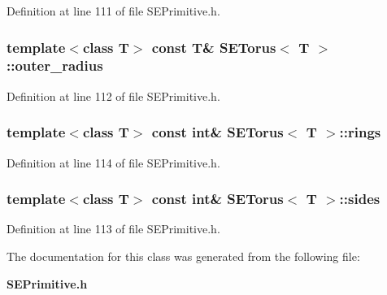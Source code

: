 Definition at line 111 of file S\+E\+Primitive.\+h.

\subsubsection[{outer\+\_\+radius}]{\setlength{\rightskip}{0pt plus 5cm}template$<$class T$>$ const T\& {\bf S\+E\+Torus}$<$ T $>$\+::outer\+\_\+radius}\label{class_s_e_torus_a6d769416b0188249ae9031ead04117f5}


Definition at line 112 of file S\+E\+Primitive.\+h.

\subsubsection[{rings}]{\setlength{\rightskip}{0pt plus 5cm}template$<$class T$>$ const int\& {\bf S\+E\+Torus}$<$ T $>$\+::rings}\label{class_s_e_torus_a801e36bd3b6d5f4a8e1d994e503632d7}


Definition at line 114 of file S\+E\+Primitive.\+h.

\subsubsection[{sides}]{\setlength{\rightskip}{0pt plus 5cm}template$<$class T$>$ const int\& {\bf S\+E\+Torus}$<$ T $>$\+::sides}\label{class_s_e_torus_aa7c9603962a435fe75bed807e961717c}


Definition at line 113 of file S\+E\+Primitive.\+h.



The documentation for this class was generated from the following file\+:\begin{DoxyCompactItemize}
\item 
{\bf S\+E\+Primitive.\+h}\end{DoxyCompactItemize}
